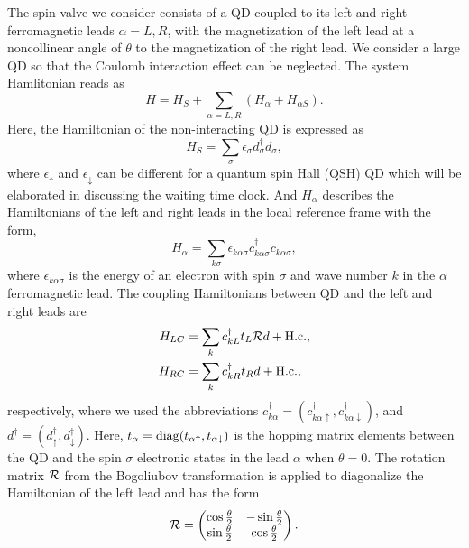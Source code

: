 \documentclass[aps,prb,twocolumn,footinbib,showpacs,superscriptaddress,preprintnumbers,amsmath,amssymb]{revtex4-1}
\begin{document}
The spin valve we consider consists of a QD coupled to its left and right ferromagnetic leads $\alpha = L,R$, with the magnetization of the left lead at a noncollinear angle of $\theta$ to the magnetization of the right lead. We consider a large QD so that the Coulomb interaction effect can be neglected. The system Hamlitonian reads as
\begin{equation}
H= H_S + \sum_{\alpha=L,R} (H_\alpha + H_{\alpha S}) .
\end{equation}
Here, the Hamiltonian of the non-interacting QD is expressed as
\begin{equation}
H_S = \sum_{\sigma} \epsilon_{\sigma} d_{\sigma}^\dag d_{\sigma}, 
\end{equation}
where $\epsilon_{\uparrow}$ and $\epsilon_{\downarrow}$ can be different for a quantum spin Hall (QSH) QD \cite{QSH_QD1, QSH_QD2, QSH_QD3} which will be elaborated in discussing the waiting time clock.  
And $H_\alpha$ describes the Hamiltonians of the left and right leads in the local reference frame with the form, 
\begin{equation}
H_\alpha = \sum_{k\sigma} \epsilon_{k\alpha\sigma} c_{k\alpha\sigma}^\dag c_{k\alpha\sigma},
\end{equation}
where $\epsilon_{k\alpha\sigma}$ is the energy of an electron with spin $\sigma$ and wave number $k$ in the $\alpha$ ferromagnetic lead. 
The coupling Hamiltonians between QD and the left and right leads are \cite{angle3}
\begin{align}
H_{LC}& =\sum_k c_{kL}^\dag t_L {\cal R} d +\rm{H.c.} , \notag \\
H_{RC}& =\sum_k c_{kR}^\dag t_R d +\rm{H.c.} ,
\end{align}
respectively, where we used the abbreviations 
$c_{k\alpha}^\dag=(c_{k\alpha\uparrow}^\dag, c_{k\alpha\downarrow}^\dag)$, and $d^\dag=(d_{\uparrow}^\dag,  d_{\downarrow}^\dag)$. Here, $t_{\alpha}={\rm diag}(t_{\alpha\uparrow}, t_{\alpha\downarrow})$ is the hopping matrix elements between the QD and the spin $\sigma$ electronic states in the lead $\alpha$ when $\theta=0$. The rotation matrix ${\cal R}$ from the Bogoliubov transformation is applied to diagonalize the Hamiltonian of the left lead and has the form \cite{gm2}
\begin{equation}  \label{rotation}
{\cal R}=\begin{pmatrix}
\cos\frac{\theta}{2} & -\sin\frac{\theta}{2} \\
\sin\frac{\theta}{2} & \cos\frac{\theta}{2}
\end{pmatrix} .
\end{equation}
\end{document}
